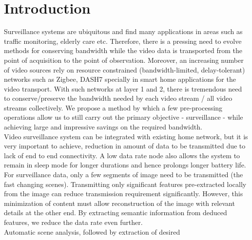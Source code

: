 \documentclass[conference]{IEEEtran}
\begin{document}




%
\IEEEpeerreviewmaketitle



\section{Introduction}
\indent Surveillance systems are ubiquitous and find many applications
in areas such as traffic monitoring, elderly care etc. Therefore, there
is a pressing need to evolve methods for conserving bandwidth while the
video data is transported from the point of acquisition to the point of
observation. Moreover, an increasing number of video sources rely on
resource constrained (bandwidth-limited, delay-tolerant) networks
such as Zigbee, DASH7 specially in smart home applications for the video
transport. With such networks at layer 1 and 2, there is tremendous
need to conserve/preserve the bandwidth needed by each video stream /
all video streams collectively. We propose a method by which a few
pre-processing operations allow us to still carry out the primary
objective - surveillance - while achieving large and impressive savings
on the required bandwidth.\\
\indent Video surveillance system can be integrated with existing home
network, but it is very important to achieve, reduction in amount
of data to be transmitted due to lack of end to end connectivity. A low
data rate node also allows the system to remain in sleep mode for
longer durations and hence prolongs longer battery life.\\
\indent For surveillance data, only a few segments of image need to be
transmitted (the fast changing scenes). Transmitting only significant
features pre-extracted locally from the image can reduce transmission
requirement significantly. However, this minimization of content must
allow reconstruction of the image with relevant details at the other
end. By extracting semantic information from deduced features, we
reduce the data rate even further.\\
\indent Automatic scene analysis, followed by extraction of  desired
\end{document}
